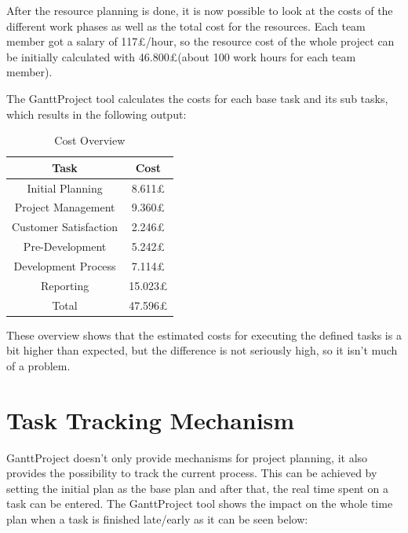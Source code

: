 After the resource planning is done, it is now possible to look at the costs of
the different work phases as well as the total cost for the resources. Each team
member got a salary of 117\pounds/hour, so the resource cost of the whole
project can be initially calculated with 46.800\pounds (about 100 work hours for
each team member).

The GanttProject tool calculates the costs for each base task and its sub tasks,
which results in the following output:

\begin{table}[h!]
  \centering
\begin{adjustbox}{max width=\textwidth}
\begin{tabular}{|c|c|}
Task&Cost\\
\hline
\rowcolor{lightgray}Initial Planning&8.611\pounds\\
Project Management&9.360\pounds\\
\rowcolor{lightgray}Customer Satisfaction&2.246\pounds\\
Pre-Development&5.242\pounds\\
\rowcolor{lightgray}Development Process&7.114\pounds\\
Reporting&15.023\pounds\\
\rowcolor{lightgray}Total&47.596\pounds\\
\end{tabular}
\end{adjustbox}
\captionsetup{justification=centering}
  \caption{Cost Overview}
  \label{tab:cost overview}
\end{table}

These overview shows that the estimated costs for executing the defined tasks is
a bit higher than expected, but the difference is not seriously high, so it
isn't much of a problem.

\section{Task Tracking Mechanism}

GanttProject doesn't only provide mechanisms for project planning, it also
provides the possibility to track the current process. This can be achieved by
setting the initial plan as the base plan and after that, the real time spent on
a task can be entered. The GanttProject tool shows the impact on the whole time
plan when a task is finished late/early as it can be seen below:

